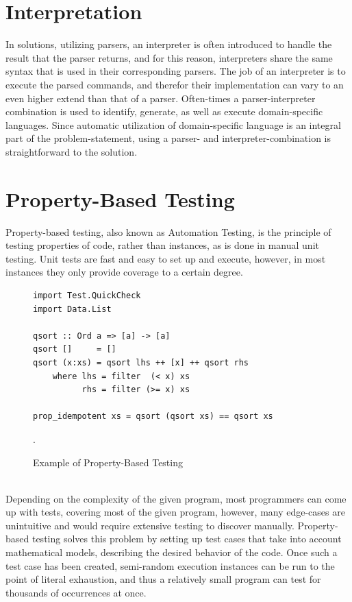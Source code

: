 \section{Interpretation}
In solutions, utilizing parsers, an interpreter is often introduced to handle the result that the parser returns, and for this reason, interpreters share the same syntax that is used in their corresponding parsers. The job of an interpreter is to execute the parsed commands, and therefor their implementation can vary to an even higher extend than that of a parser. Often-times a parser-interpreter combination is used to identify, generate, as well as execute domain-specific languages. Since automatic utilization of domain-specific language is an integral part of the problem-statement, using a parser- and interpreter-combination is straightforward to the solution.

\section{Property-Based Testing}

Property-based testing, also known as Automation Testing, is the principle of testing properties of code, rather than instances, as is done in manual unit testing. Unit tests are fast and easy to set up and execute, however, in most instances they only provide coverage to a certain degree.

\begin{figure}[h]
	\centering
	\begin{lstlisting}
import Test.QuickCheck
import Data.List

qsort :: Ord a => [a] -> [a]
qsort []     = []
qsort (x:xs) = qsort lhs ++ [x] ++ qsort rhs
    where lhs = filter  (< x) xs
          rhs = filter (>= x) xs

prop_idempotent xs = qsort (qsort xs) == qsort xs
	\end{lstlisting}
	\caption{Example of Property-Based Testing~\cite{realWorldHaskell11}}.
	\label{fig:pbtEx}
\end{figure}\ \\

\noindent
Depending on the complexity of the given program, most programmers can come up with tests, covering most of the given program, however, many edge-cases are unintuitive and would require extensive testing to discover manually. Property-based testing solves this problem by setting up test cases that take into account mathematical models, describing the desired behavior of the code. Once such a test case has been created, semi-random execution instances can be run to the point of literal exhaustion, and thus a relatively small program can test for thousands of occurrences at once.

